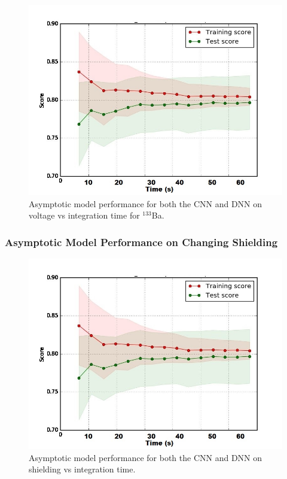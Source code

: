 \begin{figure}[H]
	\centering
	\includegraphics[width=0.75\linewidth]{model_choice_hyperparameter_search_images/asymptotic_performance_time}
	\caption{Asymptotic model performance for both the CNN and DNN on voltage vs integration time for $^{133}$Ba.}
	\label{fig:model_asymptotic_performance_ba133}
\end{figure}

\subsubsection{Asymptotic Model Performance on Changing Shielding}

\begin{figure}[H]
	\centering
	\includegraphics[width=0.75\linewidth]{model_choice_hyperparameter_search_images/asymptotic_performance_time}
	\caption{Asymptotic model performance for both the CNN and DNN on shielding vs integration time.}
	\label{fig:asymptotic_performance}
\end{figure}


